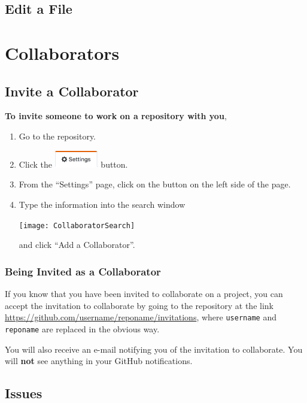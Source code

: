 \documentclass[11pt]{article}
\begin{document}
\subsection{Edit a File}

\section{Collaborators}

\subsection{Invite a Collaborator} 

\textbf{To invite someone to work on a repository with you},

\begin{enumerate}
\item Go to the repository.
\item Click the \includegraphics[width=0.75in]{SettingsButton} button.  
\item From the ``Settings'' page, click on the  button on the left side of the page.
\item Type the information into the search window \begin{center} 
\texttt{[image: CollaboratorSearch]}
\end{center}
and click ``Add a Collaborator''. 
\end{enumerate}

\subsubsection{Being Invited as a Collaborator}

If you know that you have been invited to collaborate on a project, you can accept the invitation to collaborate by going to the repository at the link \url{https://github.com/username/reponame/invitations}, where \texttt{username} and \texttt{reponame} are replaced in the obvious way. 

You will also receive an e-mail notifying you of the invitation to collaborate. You will \textbf{not} see anything in your GitHub notifications. 

\hypertarget{issues-section}{\subsection{Issues}}
\end{document}
